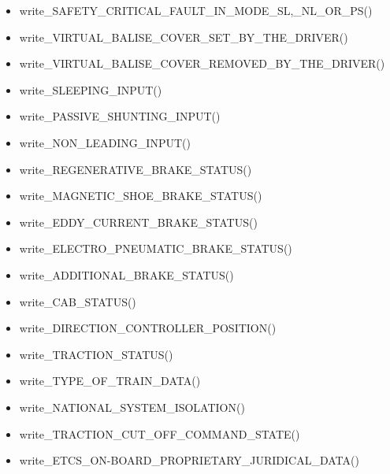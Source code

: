 \documentclass{template/openetcs_article}
\begin{document}
\begin{itemize}
				\item write\_SAFETY\_CRITICAL\_FAULT\_IN\_MODE\_SL,\_NL\_OR\_PS()
				\item write\_VIRTUAL\_BALISE\_COVER\_SET\_BY\_THE\_DRIVER()
				\item write\_VIRTUAL\_BALISE\_COVER\_REMOVED\_BY\_THE\_DRIVER()
				\item write\_SLEEPING\_INPUT()
				\item write\_PASSIVE\_SHUNTING\_INPUT()
				\item write\_NON\_LEADING\_INPUT()
				\item write\_REGENERATIVE\_BRAKE\_STATUS()
				\item write\_MAGNETIC\_SHOE\_BRAKE\_STATUS()
				\item write\_EDDY\_CURRENT\_BRAKE\_STATUS()
				\item write\_ELECTRO\_PNEUMATIC\_BRAKE\_STATUS()
				\item write\_ADDITIONAL\_BRAKE\_STATUS()
				\item write\_CAB\_STATUS()
				\item write\_DIRECTION\_CONTROLLER\_POSITION()
				\item write\_TRACTION\_STATUS()
				\item write\_TYPE\_OF\_TRAIN\_DATA()
				\item write\_NATIONAL\_SYSTEM\_ISOLATION()
				\item write\_TRACTION\_CUT\_OFF\_COMMAND\_STATE()
				\item write\_ETCS\_ON-BOARD\_PROPRIETARY\_JURIDICAL\_DATA()
			\end{itemize}







\end{document}

